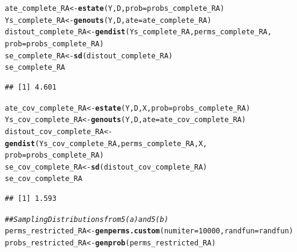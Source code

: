 \documentclass[11pt,notitlepage]{article}\usepackage[]{graphicx}\usepackage[]{color}
\makeatletter
\newcommand{\hlnum}[1]{\textcolor[rgb]{0.686,0.059,0.569}{#1}}%
\newcommand{\hlcom}[1]{\textcolor[rgb]{0.678,0.584,0.686}{\textit{#1}}}%
\newcommand{\hlstd}[1]{\textcolor[rgb]{0.345,0.345,0.345}{#1}}%
\newcommand{\hlkwb}[1]{\textcolor[rgb]{0.69,0.353,0.396}{#1}}%
\newcommand{\hlkwc}[1]{\textcolor[rgb]{0.333,0.667,0.333}{#1}}%
\newcommand{\hlkwd}[1]{\textcolor[rgb]{0.737,0.353,0.396}{\textbf{#1}}}%
\newenvironment{kframe}{%
 \def\at@end@of@kframe{}%
 \ifinner\ifhmode%
  \def\at@end@of@kframe{\end{minipage}}%
  \begin{minipage}{\columnwidth}%
 \fi\fi%
 \def\FrameCommand##1{\hskip\@totalleftmargin \hskip-\fboxsep
 \colorbox{shadecolor}{##1}\hskip-\fboxsep
     \hskip-\linewidth \hskip-\@totalleftmargin \hskip\columnwidth}%
 \MakeFramed {\advance\hsize-\width
   \@totalleftmargin\z@ \linewidth\hsize
   \@setminipage}}%
 {\par\unskip\endMakeFramed%
 \at@end@of@kframe}
\newenvironment{knitrout}{}{} %
\makeatother
\begin{document}
\begin{enumerate}[a)]
\begin{knitrout}
\begin{kframe}
\begin{alltt}
\hlstd{ate_complete_RA} \hlkwb{<-} \hlkwd{estate}\hlstd{(Y,D,}\hlkwc{prob}\hlstd{=probs_complete_RA)}
\hlstd{Ys_complete_RA} \hlkwb{<-} \hlkwd{genouts}\hlstd{(Y,D,}\hlkwc{ate}\hlstd{=ate_complete_RA)}
\hlstd{distout_complete_RA} \hlkwb{<-} \hlkwd{gendist}\hlstd{(Ys_complete_RA,perms_complete_RA,}
                               \hlkwc{prob}\hlstd{=probs_complete_RA)}
\hlstd{se_complete_RA} \hlkwb{<-} \hlkwd{sd}\hlstd{(distout_complete_RA)}
\hlstd{se_complete_RA}
\end{alltt}
\begin{verbatim}
## [1] 4.601
\end{verbatim}
\begin{alltt}
\hlstd{ate_cov_complete_RA} \hlkwb{<-} \hlkwd{estate}\hlstd{(Y,D,X,}\hlkwc{prob}\hlstd{=probs_complete_RA)}
\hlstd{Ys_cov_complete_RA} \hlkwb{<-} \hlkwd{genouts}\hlstd{(Y,D,}\hlkwc{ate}\hlstd{=ate_cov_complete_RA)}
\hlstd{distout_cov_complete_RA} \hlkwb{<-} \hlkwd{gendist}\hlstd{(Ys_cov_complete_RA,perms_complete_RA,X,}
                                   \hlkwc{prob}\hlstd{=probs_complete_RA)}
\hlstd{se_cov_complete_RA} \hlkwb{<-} \hlkwd{sd}\hlstd{(distout_cov_complete_RA)}
\hlstd{se_cov_complete_RA}
\end{alltt}
\begin{verbatim}
## [1] 1.593
\end{verbatim}
\begin{alltt}
\hlcom{## Sampling Distributions from 5(a) and 5(b)}
\hlstd{perms_restricted_RA} \hlkwb{<-} \hlkwd{genperms.custom}\hlstd{(}\hlkwc{numiter}\hlstd{=}\hlnum{10000}\hlstd{,}\hlkwc{randfun}\hlstd{=randfun)}
\hlstd{probs_restricted_RA} \hlkwb{<-} \hlkwd{genprob}\hlstd{(perms_restricted_RA)}


\end{alltt}
\end{kframe}
\end{knitrout}
\end{enumerate}
\end{document}
